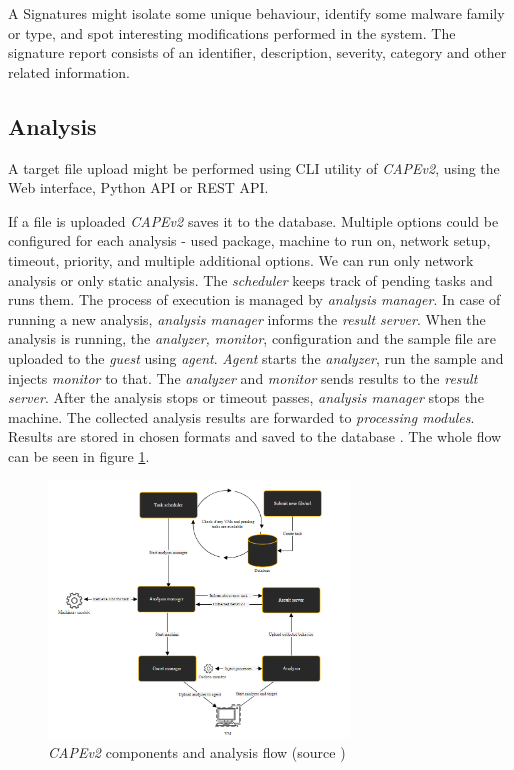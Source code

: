 A Signatures might isolate some unique behaviour, identify some malware family or type, and spot interesting modifications performed in the system. The signature report consists of an identifier, description, severity, category and other related information.

\subsection{Analysis}
A target file upload might be performed using CLI utility of \emph{CAPEv2}, using the Web interface,  Python API or REST API.

If a file is uploaded \emph{CAPEv2} saves it to the database. Multiple options could be configured for each analysis - used package, machine to run on, network setup, timeout, priority, and multiple additional options. We can run only network analysis or only static analysis. The \emph{scheduler} keeps track of pending tasks and runs them. The process of execution is managed by \emph{analysis manager}. In case of running a new analysis, \emph{analysis manager} informs the \emph{result server}. When the analysis is running, the \emph{analyzer, monitor}, configuration and the sample file are uploaded to the \emph{guest} using \emph{agent}. \emph{Agent} starts the \emph{analyzer}, run the sample and injects \emph{monitor} to that. The \emph{analyzer} and \emph{monitor} sends results to the \emph{result server}. After the analysis stops or timeout passes, \emph{analysis manager} stops the machine. The collected analysis results are forwarded to \emph{processing modules}. Results are stored in chosen formats and saved to the database \cite{CuckooSa10:online}. The whole flow can be seen in figure \ref{fig:capeflow}.

\begin{figure}[h]
  \centering
  \includegraphics[width=8cm]{figures/flow.png}
  \caption{\emph{CAPEv2} components and analysis flow (source \cite{CuckooSa10:online})}
  \label{fig:capeflow}
\end{figure}


